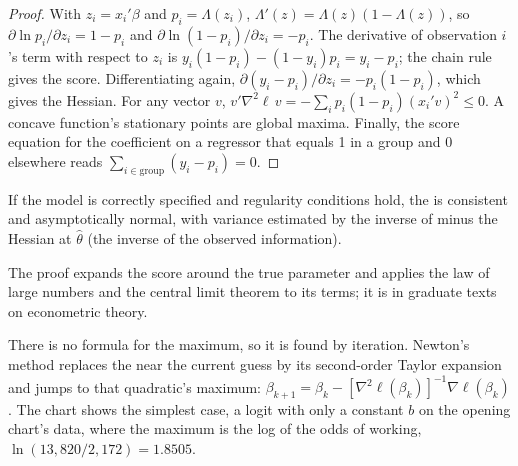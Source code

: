\begin{proof}
With $z_i = x_i'\beta$ and $p_i = \Lambda(z_i)$, $\Lambda'(z) = \Lambda(z)(1 -
\Lambda(z))$, so $\partial \ln p_i/\partial z_i = 1 - p_i$ and $\partial \ln(1 -
p_i)/\partial z_i = -p_i$. The derivative of observation $i$'s term with respect
to $z_i$ is $y_i(1 - p_i) - (1 - y_i)p_i = y_i - p_i$; the chain rule gives the
score. Differentiating again, $\partial (y_i - p_i)/\partial z_i = -p_i(1 - p_i)$,
which gives the Hessian. For any vector $v$, $v' \nabla^2\ell\, v = -\sum_i
p_i(1 - p_i)(x_i'v)^2 \le 0$. A concave function's stationary points are global
maxima. Finally, the score equation for the coefficient on a regressor that
equals 1 in a group and 0 elsewhere reads $\sum_{i \in \text{group}} (y_i - p_i) =
0$.
\end{proof}

\begin{proposition}\label{prop:b3:binary-outcomes:mle}
If the model is correctly specified and regularity conditions hold, the  is consistent and asymptotically normal, with variance
estimated by the inverse of minus the Hessian at $\hat\theta$ (the inverse of
the observed information).
\end{proposition}

\admitted
The proof expands the score around the true parameter and applies the law of
large numbers and the central limit theorem to its terms; it is in graduate
texts on econometric theory.

There is no formula for the maximum, so it is found by iteration. Newton's
method replaces the  near the current guess by its second-order
Taylor expansion and jumps to that quadratic's maximum: $\beta_{k+1} = \beta_k -
[\nabla^2\ell(\beta_k)]^{-1} \nabla\ell(\beta_k)$. The chart shows the simplest
case, a logit with only a constant $b$ on the opening chart's data, where the
maximum is the log of the odds of working, $\ln(13{,}820/2{,}172) = 1.8505$.

